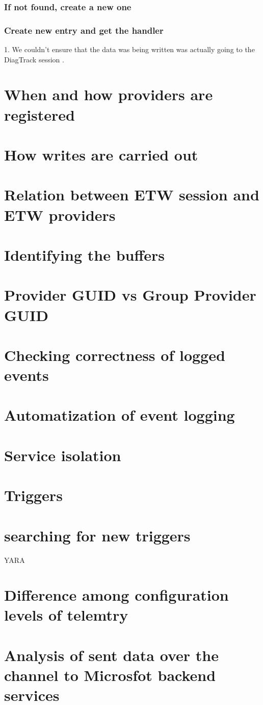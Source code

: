 \subsubsection{If not found, create a new one}
\subsubsection{Create new entry and get the handler }

\newpage
{\huge 1. We couldn't ensure that the data was being written was actually going to the DiagTrack session .}

\section{When and how providers are registered}
\section{How writes are carried out}
\section{Relation between ETW session and ETW providers}
\section{Identifying the buffers}
\section{Provider GUID vs Group Provider GUID}
\section{Checking correctness of logged events}
\section{Automatization of event logging}
\section{Service isolation}
\section{Triggers}
\section{searching for new triggers} YARA
\section{Difference among configuration levels of telemtry}
\section{Analysis of sent data over the channel to Microsfot backend services}
